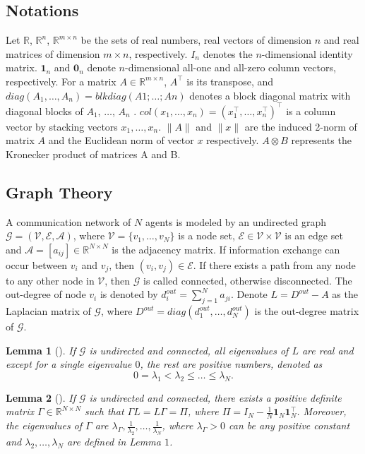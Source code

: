 \documentclass[final,5p,times,twocolumn,authoryear]{elsarticle}
\newtheorem{lemma}{ {Lemma}}
\begin{document}
\subsection{Notations}
Let $\mathbb{R}$, $\mathbb{R}^n$, $\mathbb{R}^{m\times n}$ be the sets of real numbers, real vectors of dimension $n$ and real matrices of dimension $m\times n$, respectively. $I_n$ denotes the $n$-dimensional identity matrix. $\boldsymbol1_n$ and $\boldsymbol0_n$ denote $n$-dimensional all-one and all-zero column vectors, respectively. For a matrix $A\in\mathbb{R}^{m \times n}$, $A^\top $ is its transpose, and  $diag(A_1,\dots,A_n)=blkdiag(A1; \dots; An)$ denotes a block diagonal matrix with diagonal blocks of $A_1$, $\dots$, $A_n$ . $col(x_1,\dots,x_n) = (x_1^\top ,\dots,x_n^\top )^\top $ is a column vector by stacking vectors $x_1,\dots,x_n$. $\|A\|$ and $\|x\|$ are the induced 2-norm of matrix $A$ and the Euclidean norm of vector $x$ respectively. $A\otimes B$ represents the Kronecker product of matrices A and B. 

\subsection{Graph Theory}
A communication network of $N$ agents is modeled by an undirected graph $\mathcal{G} = (\mathcal{V}, \mathcal{E}, \mathcal{A})$, where $\mathcal{V} = \{v_1, \dots, v_N\}$ is a node set, $\mathcal{E} \in \mathcal{V} \times \mathcal{V}$ is an edge set and $\mathcal{A}= [a_{ij}]\in \mathbb{R}^{N \times N}$ is the adjacency matrix. If information exchange can occur between $v_i$ and $v_j$, then $(v_i,v_j) \in \mathcal{E}$. If there exists a path from any node to any other node in $\mathcal{V}$, then $\mathcal{G}$ is called connected, otherwise disconnected. The out-degree of node $v_i$ is denoted by $d_i^{out} = \sum_{j=1}^{N}a_{ji}$. Denote $L=D^{out}-A$ as the Laplacian matrix of $\mathcal{G}$, where $D^{out}=diag(d_1^{out}, \dots, d_N^{out})$ is the out-degree matrix of $\mathcal{G}$.

\begin{lemma}[\citealp{tu}]\label{lemma1}
	If $\mathcal{G}$ is undirected and connected, all eigenvalues  of $L$ are real and except for a single eigenvalue $0$, the rest are positive numbers, denoted as
	$$0=\lambda_1<\lambda_2\le \dots \le \lambda_N.$$
\end{lemma}

\begin{lemma}[\citealp{li2020}]\label{lemma2}
	If $\mathcal{G}$ is undirected and connected, there exists a positive definite matrix $\Gamma \in \mathbb{R}^{N\times N}$ such that $\Gamma L = L\Gamma=\Pi$, where $\Pi=I_N-\frac{1}{N}\boldsymbol1_N\boldsymbol1_N^\top $.
	Moreover, the eigenvalues of $\Gamma$ are $\lambda_\Gamma, \frac{1}{\lambda_2}, \dots, \frac{1}{\lambda_N}$, where $\lambda_\Gamma>0$ can be any positive constant and $\lambda_2, \dots, \lambda_N$ are defined in Lemma $1$.
\end{lemma}
\end{document}
